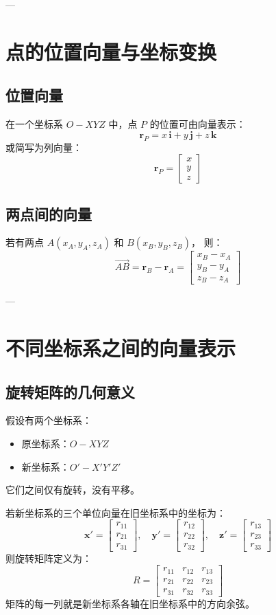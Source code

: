 \documentclass[12pt,a4paper]{article}
\begin{document}
---

\section{点的位置向量与坐标变换}
\subsection{位置向量}
在一个坐标系 $O-XYZ$ 中，点 $P$ 的位置可由向量表示：
\[
\boldsymbol{r}_P = x\,\boldsymbol{i} + y\,\boldsymbol{j} + z\,\boldsymbol{k}
\]
或简写为列向量：
\[
\boldsymbol{r}_P =
\begin{bmatrix}
x \\ y \\ z
\end{bmatrix}
\]

\subsection{两点间的向量}
若有两点 $A(x_A, y_A, z_A)$ 和 $B(x_B, y_B, z_B)$，  
则：
\[
\overrightarrow{AB} = \boldsymbol{r}_B - \boldsymbol{r}_A =
\begin{bmatrix}
x_B - x_A \\ y_B - y_A \\ z_B - z_A
\end{bmatrix}
\]

---

\section{不同坐标系之间的向量表示}
\subsection{旋转矩阵的几何意义}
假设有两个坐标系：
\begin{itemize}
  \item 原坐标系：$O-XYZ$
  \item 新坐标系：$O'-X'Y'Z'$
\end{itemize}
它们之间仅有旋转，没有平移。

若新坐标系的三个单位向量在旧坐标系中的坐标为：
\[
\boldsymbol{x}' = 
\begin{bmatrix} r_{11} \\ r_{21} \\ r_{31} \end{bmatrix},\quad
\boldsymbol{y}' = 
\begin{bmatrix} r_{12} \\ r_{22} \\ r_{32} \end{bmatrix},\quad
\boldsymbol{z}' = 
\begin{bmatrix} r_{13} \\ r_{23} \\ r_{33} \end{bmatrix}
\]
则旋转矩阵定义为：
\[
R =
\begin{bmatrix}
r_{11} & r_{12} & r_{13}\\
r_{21} & r_{22} & r_{23}\\
r_{31} & r_{32} & r_{33}
\end{bmatrix}
\]
矩阵的每一列就是新坐标系各轴在旧坐标系中的方向余弦。
\end{document}
